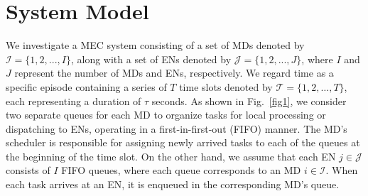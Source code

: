\documentclass[10pt, journal,letterpaper]{IEEEtran}
\begin{document}
\section{System Model} 
\label{section:III}
\label{sec:latexhints}
\newcount\LTGbeginlineexample
\newcount\LTGendlineexample 
\newenvironment{ltgexample}%
{\LTGbeginlineexample=\numexpr\inputlineno+1\relax}%
{\LTGendlineexample=\numexpr\inputlineno-1\relax%
	\tcbinputlisting{%
		listing only,
		listing file=\currfilepath, 
		colback=green!5!white,
		colslot=green!25,
		coltitle=black!90,
		coltext=black!90,
		left=8mm,
		title=Corresponding \LaTeX{} code of \texttt{\currfilepath},
		listing options={%
			slot=none,
			language={[LaTeX]TeX},
			escapeinside={},
			firstline=\the\LTGbeginlineexample,
			lastline=\the\LTGendlineexample,
			firstnumber=\the\LTGbeginlineexample,
			basewidth=.5em,
			aboveskip=0mm,
			belowskip=0mm,
			numbers=left,
			xleftmargin=0mm,
			numberstyle=\tiny,
			numbersep=8pt%
		}
	}
}%
We investigate a MEC system consisting of a set of MDs denoted by $\mathcal{I} = \{1, 2, ..., I\}$, along with a set of ENs denoted by $\mathcal{J} = \{1, 2, ..., J\}$, where $I$ and $J$ represent the number of MDs and ENs, respectively. We regard time as a specific episode containing a series of $T$ time slots denoted by $\mathcal{T} = \{1, 2, \ldots, T\}$, each representing a duration of $\tau$ seconds. As shown in Fig.~\ref{fig1}, we consider two separate queues for each MD to organize tasks for local processing or dispatching to ENs, operating in a first-in-first-out (FIFO) manner. The MD's scheduler is responsible for assigning newly arrived tasks to each of the queues at the beginning of the time slot. On the other hand, we assume that each EN $j \in \mathcal{J}$ consists of $I$ FIFO queues, where each queue corresponds to an MD $i \in \mathcal{I}$. When each task arrives at an EN, it is enqueued in the corresponding MD's queue. %
\end{document}
